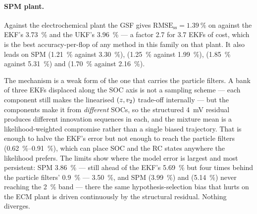 \paragraph{SPM plant.}  Against the electrochemical plant the GSF gives
$\mathrm{RMSE}_{\mathrm{ss}} = \SI{1.39}{\percent}$ on  against the EKF's
\SI{3.73}{\percent} and the UKF's \SI{3.96}{\percent} --- a factor \num{2.7} for \num{3.7} EKFs of
cost, which is the best accuracy-per-flop of any method in this family on that plant.  It also leads
on SPM  (\SI{1.21}{\percent} against \SI{3.30}{\percent}), 
(\SI{1.25}{\percent} against \SI{1.99}{\percent}),  (\SI{1.85}{\percent}
against \SI{5.31}{\percent}) and  (\SI{1.70}{\percent} against \SI{2.16}{\percent}).

The mechanism is a weak form of the one that carries the particle filters.  A bank of three EKFs
displaced along the SOC axis is not a sampling scheme --- each component still makes the linearised
$(z, v_2)$ trade-off internally --- but the components make it from \emph{different} SOCs, so the
structured \SI{4}{\milli\volt} residual produces different innovation sequences in each, and the
mixture mean is a likelihood-weighted compromise rather than a single biased trajectory.  That is
enough to halve the EKF's error but not enough to reach the particle filters
(\SIrange{0.62}{0.91}{\percent}), which can place SOC and the RC states anywhere the likelihood
prefers.  The limits show where the model error is largest and most persistent: SPM
 \SI{3.86}{\percent} --- still ahead of the EKF's \SI{5.69}{\percent} but
four times behind the particle filters' \SI{0.9}{\percent} --- 
\SI{3.50}{\percent}, and SPM  (\SI{3.99}{\percent}) and
 (\SI{5.14}{\percent}) never reaching the \SI{2}{\percent} band --- there the same
hypothesis-selection bias that hurts  on the ECM plant is driven continuously by
the structural residual.  Nothing diverges.

